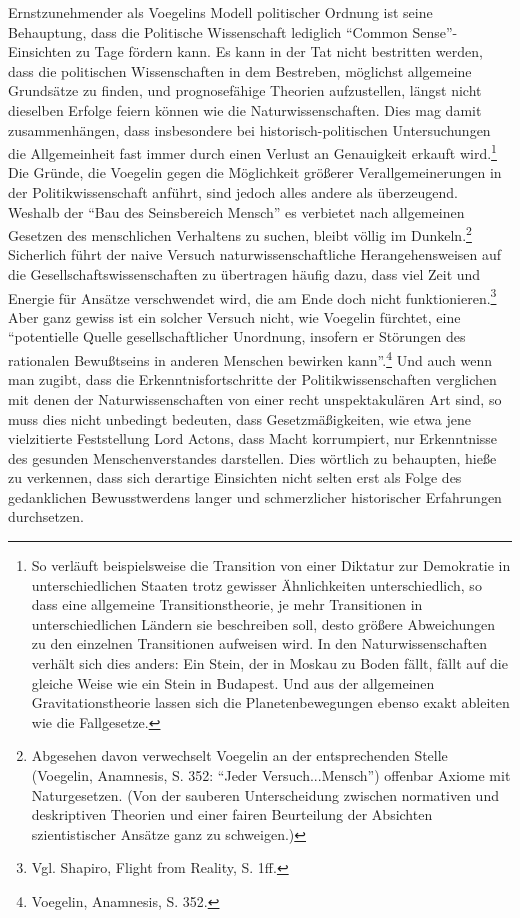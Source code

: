 Ernstzunehmender als Voegelins Modell politischer Ordnung ist seine
Be\-haup\-tung, dass die Politische Wissenschaft lediglich "`Common
Sense"'-Einsichten zu Tage fördern kann. Es kann in der Tat nicht bestritten
werden, dass die politischen Wissenschaften in dem Bestreben, möglichst
allgemeine Grundsätze zu finden, und prognosefähige Theorien aufzustellen,
längst nicht dieselben Erfolge feiern können wie die Naturwissenschaften. Dies
mag damit zusammenhängen, dass insbesondere bei historisch-politischen
Untersuchungen die Allgemeinheit fast immer durch einen Verlust an Genauigkeit
erkauft wird.\footnote{So verläuft beispielsweise die Transition von einer
  Diktatur zur Demokratie in unterschiedlichen Staaten trotz gewisser
  Ähnlichkeiten unterschiedlich, so dass eine allgemeine Transitionstheorie,
  je mehr Transitionen in unterschiedlichen Ländern sie beschreiben soll,
  desto größere Abweichungen zu den einzelnen Transitionen aufweisen wird. In
  den Naturwissenschaften verhält sich dies anders: Ein Stein, der in Moskau
  zu Boden fällt, fällt auf die gleiche Weise wie ein Stein in Budapest. Und
  aus der allgemeinen Gravitationstheorie lassen sich die Planetenbewegungen
  ebenso exakt ableiten wie die Fallgesetze.} Die Gründe, die Voegelin gegen
die Möglichkeit größerer Verallgemeinerungen in der Politikwissenschaft
anführt, sind jedoch alles andere als überzeugend. Weshalb der "`Bau des
Seinsbereich Mensch"' es verbietet nach allgemeinen Gesetzen des menschlichen
Verhaltens zu suchen, bleibt völlig im Dunkeln.\footnote{Abgesehen davon
  verwechselt Voegelin an der entsprechenden Stelle (Voegelin, Anamnesis, S.
  352: "`Jeder Versuch...Mensch"') offenbar Axiome mit Naturgesetzen.  (Von
  der sauberen Unterscheidung zwischen normativen und deskriptiven Theorien
  und einer fairen Beurteilung der Absichten szientistischer Ansätze ganz zu
  schweigen.)} Sicherlich führt der naive Versuch naturwissenschaftliche
Herangehensweisen auf die Gesellschaftswissenschaften zu übertragen häufig
dazu, dass viel Zeit und Energie für Ansätze verschwendet wird, die am Ende
doch nicht funktionieren.\footnote{Vgl. Shapiro, Flight from Reality, S. 1ff.}
Aber ganz gewiss ist ein solcher Versuch nicht, wie Voegelin fürchtet, eine
"`potentielle Quelle gesellschaftlicher Unordnung, insofern er Störungen des
rationalen Bewußtseins in anderen Menschen bewirken kann"'.\footnote{Voegelin,
  Anamnesis, S. 352.} Und auch wenn man zugibt, dass die
Erkenntnisfortschritte der Politikwissenschaften verglichen mit denen der
Naturwissenschaften von einer recht unspektakulären Art sind, so muss dies
nicht unbedingt bedeuten, dass Gesetzmäßigkeiten, wie etwa jene vielzitierte
Feststellung Lord Actons, dass Macht korrumpiert, nur Erkenntnisse des
gesunden Menschenverstandes darstellen. Dies wörtlich zu behaupten, hieße zu
verkennen, dass sich derartige Einsichten nicht selten erst als Folge des
gedanklichen Bewusstwerdens langer und schmerzlicher historischer Erfahrungen
durchsetzen.

